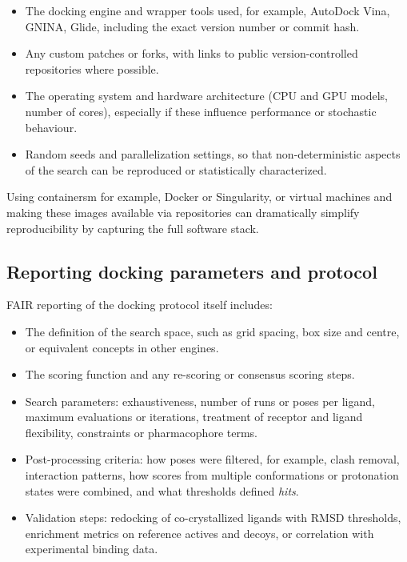 \documentclass[12pt]{article}
\begin{document}
\begin{itemize}
  \item The docking engine and wrapper tools used, for example, AutoDock Vina, GNINA, Glide, including the exact version number or commit hash.
  \item Any custom patches or forks, with links to public version-controlled repositories where possible.
  \item The operating system and hardware architecture (CPU and GPU models, number of cores), especially if these influence performance or stochastic behaviour.
  \item Random seeds and parallelization settings, so that non-deterministic aspects of the search can be reproduced or statistically characterized.
\end{itemize}

Using containersm for example, Docker or Singularity, or virtual machines and making these images available via repositories can dramatically simplify reproducibility by capturing the full software stack.\cite{CH12_reproWorkflows2017,CH12_toolsRepro2016}

\subsection{Reporting docking parameters and protocol}

FAIR reporting of the docking protocol itself includes:

\begin{itemize}
  \item The definition of the search space, such as grid spacing, box size and centre, or equivalent concepts in other engines.
  \item The scoring function and any re-scoring or consensus scoring steps.
  \item Search parameters: exhaustiveness, number of runs or poses per ligand, maximum evaluations or iterations, treatment of receptor and ligand flexibility, constraints or pharmacophore terms.
  \item Post-processing criteria: how poses were filtered, for example, clash removal, interaction patterns, how scores from multiple conformations or protonation states were combined, and what thresholds defined \emph{hits}.
  \item Validation steps: redocking of co-crystallized ligands with RMSD thresholds, enrichment metrics on reference actives and decoys, or correlation with experimental binding data.
\end{itemize}
\end{document}
